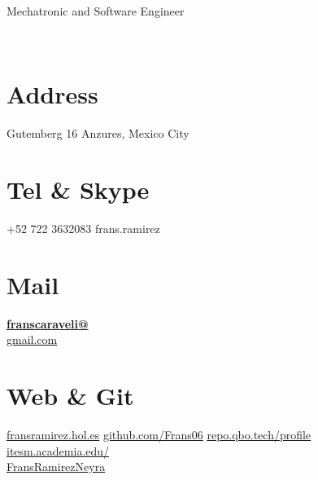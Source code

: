 \documentclass[]{friggeri-cv}
\begin{document}
      {Mechatronic and Software Engineer}
      

\begin{aside}
	~
	~
	~
	~
	~
	~
	~
  \section{Address}
    Gutemberg 16
    Anzures, Mexico City
    ~
  \section{Tel \& Skype}
    +52 722 3632083
    frans.ramirez
    ~
  \section{Mail}
    \href{mailto:franscaraveli@gmail.com}{\textbf{franscaraveli@}\\gmail.com}
    ~
  \section{Web \& Git}
    \href{http://fransramirez.com}{fransramirez.hol.es}
    \href{https://github.com/Frans06}{github.com/Frans06}
    \href{https://repo.qbo.tech:5443/profile}{repo.qbo.tech/profile}
    \href{https://itesm.academia.edu/FransRamirezNeyra}{itesm.academia.edu/\\FransRamirezNeyra}
\end{aside}
\end{document}
